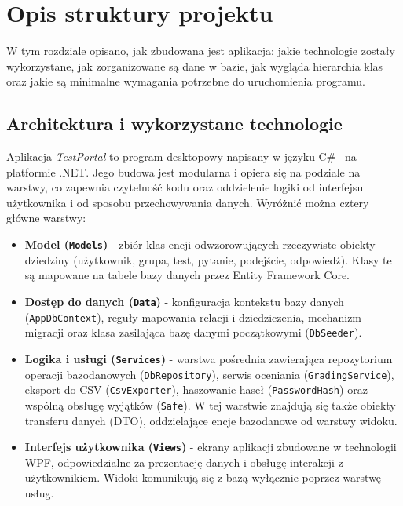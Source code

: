 ﻿\chapter{Opis struktury projektu}
\label{cha:struktura}

W tym rozdziale opisano, jak zbudowana jest aplikacja: jakie technologie zostały wykorzystane, jak
zorganizowane są dane w bazie, jak wygląda hierarchia klas oraz jakie są minimalne wymagania
potrzebne do uruchomienia programu.

\section{Architektura i wykorzystane technologie}
\label{sec:architektura}

Aplikacja \emph{TestPortal} to program desktopowy napisany w języku C\#~\cite{msdocsCSharp} na
platformie .NET. Jego
budowa jest modularna i opiera się na podziale na warstwy, co zapewnia czytelność kodu oraz
oddzielenie logiki od interfejsu użytkownika i od sposobu przechowywania danych. Wyróżnić można
cztery główne warstwy:

\begin{itemize}
  \item \textbf{Model (\texttt{Models})} - zbiór klas encji odwzorowujących rzeczywiste obiekty
        dziedziny (użytkownik, grupa, test, pytanie, podejście, odpowiedź). Klasy te są mapowane na
        tabele bazy danych przez Entity Framework Core.

  \item \textbf{Dostęp do danych (\texttt{Data})} - konfiguracja kontekstu bazy danych
        (\texttt{AppDbContext}), reguły mapowania relacji i dziedziczenia, mechanizm migracji oraz
        klasa zasilająca bazę danymi początkowymi (\texttt{DbSeeder}).

  \item \textbf{Logika i usługi (\texttt{Services})} - warstwa pośrednia zawierająca repozytorium
        operacji bazodanowych (\texttt{DbRepository}), serwis oceniania (\texttt{GradingService}),
        eksport do CSV (\texttt{CsvExporter}), haszowanie haseł (\texttt{PasswordHash}) oraz wspólną
        obsługę wyjątków (\texttt{Safe}). W tej warstwie znajdują się także obiekty transferu danych
        (DTO), oddzielające encje bazodanowe od warstwy widoku.

  \item \textbf{Interfejs użytkownika (\texttt{Views})} - ekrany aplikacji zbudowane w technologii
        WPF, odpowiedzialne za prezentację danych i obsługę interakcji z użytkownikiem. Widoki
        komunikują się z bazą wyłącznie poprzez warstwę usług.
\end{itemize}

